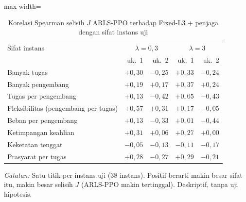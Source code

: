 \begin{table}[htbp]
\caption{Korelasi Spearman selisih $J$ ARLS-PPO terhadap Fixed-L3 + penjaga dengan sifat instans uji}
\label{tab:uji-sifat-fix3-g}
\centering\footnotesize
\setlength{\tabcolsep}{4pt}
\begin{adjustbox}{max width=\textwidth}
\begin{tabular}{lrrrr}
\toprule
Sifat instans & \multicolumn{2}{c}{$\lambda=0{,}3$} & \multicolumn{2}{c}{$\lambda=3$} \\
 & uk.~1 & uk.~2 & uk.~1 & uk.~2 \\
\midrule
Banyak tugas & $+0{,}30$ & $-0{,}25$ & $+0{,}33$ & $-0{,}24$ \\
Banyak pengembang & $+0{,}19$ & $+0{,}17$ & $+0{,}37$ & $+0{,}24$ \\
Tugas per pengembang & $+0{,}13$ & $-0{,}42$ & $+0{,}05$ & $-0{,}43$ \\
Fleksibilitas (pengembang per tugas) & $+0{,}57$ & $+0{,}31$ & $+0{,}17$ & $-0{,}05$ \\
Beban per pengembang & $+0{,}13$ & $-0{,}33$ & $+0{,}01$ & $-0{,}44$ \\
Ketimpangan keahlian & $+0{,}31$ & $+0{,}06$ & $+0{,}27$ & $+0{,}00$ \\
Keketatan tenggat & $-0{,}05$ & $-0{,}13$ & $-0{,}11$ & $-0{,}17$ \\
Prasyarat per tugas & $+0{,}28$ & $-0{,}27$ & $+0{,}29$ & $-0{,}21$ \\
\bottomrule
\end{tabular}
\end{adjustbox}
\par\smallskip\footnotesize\textit{Catatan:} Satu titik per instans uji (38 instans). Positif berarti makin besar sifat itu, makin besar selisih $J$ (ARLS-PPO makin tertinggal). Deskriptif, tanpa uji hipotesis.
\end{table}
